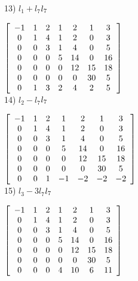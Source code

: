 \documentclass{article}
\begin{document}
13) $l_{1} + l_{7} $\to$ l_{7}\\ 
\newline$

$\left[\begin{array}{ccccccc}
-1 &  1 &  2 &  1 &  2 &  1 &  3 \\
0  &  1 &  4 &  1 &  2 &  0 &  3 \\
0  &  0 &  3 &  1 &  4 &  0 &  5 \\     
0  &  0 &  0 &  5 &  14&  0 &  16\\ 
0  &  0 &  0 &  0 &  12& 15 &  18\\ 
0  &  0 &  0 &  0 &  0&  30 &   5\\ 
0  &  1 &  3 &  2 &  4 &  2&   5\\ 
 \end{array}\right]\\
  \newline$\\
  
14) $l_{2} - l_{7} $\to$ l_{7}\\ 
\newline$

$\left[\begin{array}{ccccccc}
-1 &  1 &  2 &  1 &  2 &  1 &  3 \\
0  &  1 &  4 &  1 &  2 &  0 &  3 \\
0  &  0 &  3 &  1 &  4 &  0 &  5 \\     
0  &  0 &  0 &  5 &  14&  0 &  16\\ 
0  &  0 &  0 &  0 &  12& 15 &  18\\ 
0  &  0 &  0 &  0 &  0&  30 &   5\\ 
0  &  0 &  1 & -1 & -2&  -2 &  -2\\ 
 \end{array}\right]\\
  \newline$\\
  
15) $l_{3} - 3l_{7} $\to$ l_{7}\\ 
\newline$

$\left[\begin{array}{ccccccc}
-1 &  1 &  2 &  1 &  2 &  1 &  3 \\
0  &  1 &  4 &  1 &  2 &  0 &  3 \\
0  &  0 &  3 &  1 &  4 &  0 &  5 \\     
0  &  0 &  0 &  5 &  14&  0 &  16\\ 
0  &  0 &  0 &  0 &  12& 15 &  18\\ 
0  &  0 &  0 &  0 &  0&  30 &   5\\ 
0  &  0 &  0 &  4 &  10&  6 &  11\\ 
 \end{array}\right]\\
  \newline$\\
\end{document}
